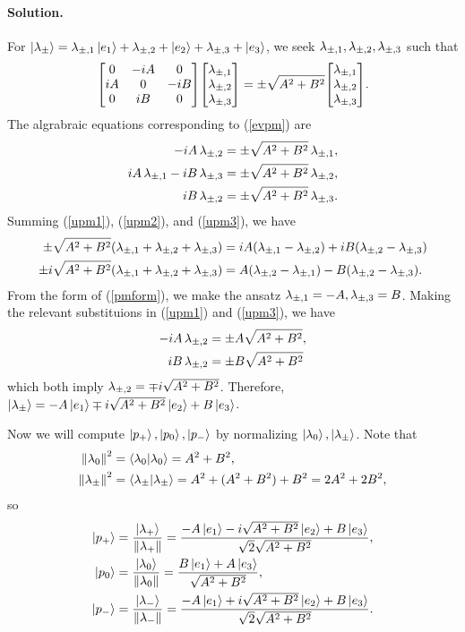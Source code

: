\documentclass[11pt]{article}
\newcommand{\refeq}[1]{(\ref{#1})}
\newenvironment{solution}
{
    \paragraph{Solution.}
    \ignorespaces
}
{
    \bigskip
}
\begin{document}
\begin{solution}
	For $\ket{\lambda_\pm} = \lambda_{\pm,1} \ket{e_1} + \lambda_{\pm,2} + \ket{e_2} + \lambda_{\pm,3} + \ket{e_3}$, we seek $\lambda_{\pm,1}, \lambda_{\pm,2}, \lambda_{\pm,3}$ such that
	\begin{equation} \label{evpm}
		\mO \mqty[\upmq \\ \upmw \\ \upme] = \pmsq \mqty[\upmq \\ \upmw \\ \upme].
	\end{equation}
	The algrabraic equations corresponding to \refeq{evpm} are
	\begin{align}
		-iA \,\lambda_{\pm,2} &= \pm \sqrt{A^2 + B^2} \,\lambda_{\pm,1}, \label{upm1} \\
		iA \,\lambda_{\pm,1} - iB \,\lambda_{\pm,3} &= \pm \sqrt{A^2 + B^2} \,\lambda_{\pm,2}, \label{upm2} \\
		iB \,\lambda_{\pm,2} &= \pm \sqrt{A^2 + B^2} \,\lambda_{\pm,3}. \label{upm3}
	\end{align}
	Summing \refeq{upm1}, \refeq{upm2}, and \refeq{upm3}, we have
	\begin{align}
		\pm \sqrt{A^2 + B^2} (\lambda_{\pm,1} + \lambda_{\pm,2} + \lambda_{\pm,3}) &= iA (\lambda_{\pm,1} - \lambda_{\pm,2}) + iB (\lambda_{\pm,2} - \lambda_{\pm,3}) \\
		\pm i \sqrt{A^2 + B^2} (\lambda_{\pm,1} + \lambda_{\pm,2} + \lambda_{\pm,3}) &= A (\lambda_{\pm,2} - \lambda_{\pm,1}) - B (\lambda_{\pm,2} - \lambda_{\pm,3}). \label{pmform}
	\end{align}
	From the form of \refeq{pmform}, we make the ansatz $\lambda_{\pm,1} = -A, \lambda_{\pm,3} = B$.  Making the relevant substituions in \refeq{upm1} and \refeq{upm3}, we have
	\begin{align}
		-iA \,\lambda_{\pm,2} &= \pm A \sqrt{A^2 + B^2}, \\ 
		iB \,\lambda_{\pm,2} &= \pm B \sqrt{A^2 + B^2}
	\end{align}
	which both imply $\lambda_{\pm,2} = \mp i \sqrt{A^2 + B^2}$.  Therefore, $\ket{\lambda_\pm} = -A \ket{e_1} \mp i \sqrt{A^2 + B^2} \ket{e_2} + B \ket{e_3}$.
	
	Now we will compute $\ket{p_+}, \ket{p_0}, \ket{p_-}$ by normalizing $\ket{\lambda_0}, \ket{\lambda_\pm}$.  Note that
	\begin{align}
		\norm{\lambda_0}^2 &= \braket{\lambda_0}{\lambda_0} = A^2 + B^2, \\
		\norm{\lambda_\pm}^2 &= \braket{\lambda_\pm}{\lambda_\pm} = A^2 + (A^2 + B^2) + B^2 = 2 A^2 + 2 B^2,
	\end{align}
	so
	\begin{align}
		\ket{p_+} &= \frac{\ket{\lambda_+}}{\norm{\lambda_+}} = \frac{-A \ket{e_1} - i \sqrt{A^2 + B^2} \ket{e_2} + B \ket{e_3}}{\sqrt{2} \sqrt{A^2 + B^2}}, \\
		\ket{p_0} &= \frac{\ket{\lambda_0}}{\norm{\lambda_0}} = \frac{B \ket{e_1} + A \ket{e_3}}{\sqrt{A^2 + B^2}}, \label{p0} \\
		\ket{p_-} &= \frac{\ket{\lambda_-}}{\norm{\lambda_-}} = \frac{-A \ket{e_1} + i \sqrt{A^2 + B^2} \ket{e_2} + B \ket{e_3}}{\sqrt{2} \sqrt{A^2 + B^2}}.
	\end{align}
\end{solution}
\end{document}

